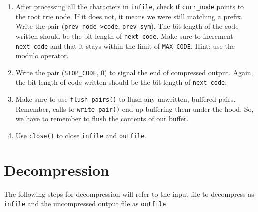 \documentclass{article}
\begin{document}
\begin{enumerate}
    \item After processing all the characters in \texttt{infile}, check
      if \texttt{curr\_node} points to the root trie node. If it does
      not, it means we were still matching a prefix. Write the pair
      (\texttt{prev\_node->code}, \texttt{prev\_sym}). The bit-length of
      the code written should be the bit-length of \texttt{next\_code}.
      Make sure to increment \texttt{next\_code} and that it stays
      within the limit of \texttt{MAX\_CODE}. Hint: use the modulo
      operator.

    \item Write the pair (\texttt{STOP\_CODE}, 0) to signal the end of
      compressed output. Again, the bit-length of code written should be
      the bit-length of \texttt{next\_code}.

    \item Make sure to use \texttt{flush\_pairs()} to flush any unwritten,
      buffered pairs. Remember, calls to \texttt{write\_pair()} end up
      buffering them under the hood. So, we have to remember to flush
      the contents of our buffer.

    \item Use \texttt{close()} to close \texttt{infile} and \texttt{outfile}.
\end{enumerate}

\section{Decompression}

The following steps for decompression will refer to the input file to decompress
as \texttt{infile} and the uncompressed output file as \texttt{outfile}.
\end{document}
